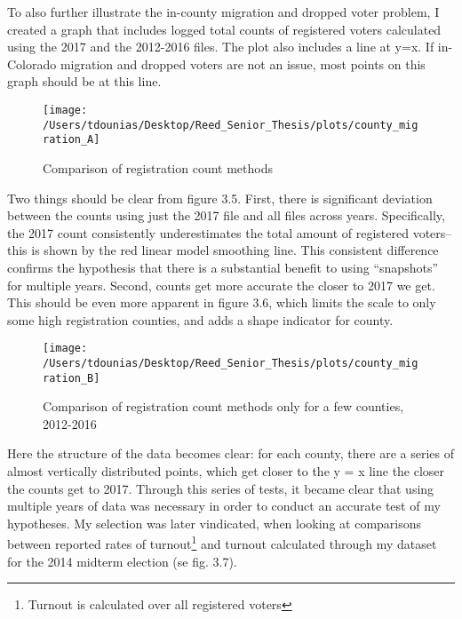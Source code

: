 \documentclass[12pt,twoside]{reedthesis}
\begin{document}
  To also further illustrate the in-county migration and dropped voter
  problem, I created a graph that includes logged total counts of
  registered voters calculated using the 2017 and the 2012-2016 files. The
  plot also includes a line at y=x. If in-Colorado migration and dropped
  voters are not an issue, most points on this graph should be at this
  line.
  
  \begin{figure}
  
  {\centering \texttt{[image: /Users/tdounias/Desktop/Reed\_Senior\_Thesis/plots/county\_migration\_A]} 
  
  }
  
  \caption[Comparison of registration count methods]{Comparison of registration count methods}\label{fig:county migration A}
  \end{figure}
  
  Two things should be clear from figure 3.5. First, there is significant
  deviation between the counts using just the 2017 file and all files
  across years. Specifically, the 2017 count consistently underestimates
  the total amount of registered voters--this is shown by the red linear
  model smoothing line. This consistent difference confirms the hypothesis
  that there is a substantial benefit to using ``snapshots'' for multiple
  years. Second, counts get more accurate the closer to 2017 we get. This
  should be even more apparent in figure 3.6, which limits the scale to
  only some high registration counties, and adds a shape indicator for
  county.
  
  \begin{figure}
  
  {\centering \texttt{[image: /Users/tdounias/Desktop/Reed\_Senior\_Thesis/plots/county\_migration\_B]} 
  
  }
  
  \caption[Comparison of registration count methods only for a few counties, 2012-2016]{Comparison of registration count methods only for a few counties, 2012-2016}\label{fig:county migration B}
  \end{figure}
  
  Here the structure of the data becomes clear: for each county, there are
  a series of almost vertically distributed points, which get closer to
  the y = x line the closer the counts get to 2017. Through this series of
  tests, it became clear that using multiple years of data was necessary
  in order to conduct an accurate test of my hypotheses. My selection was
  later vindicated, when looking at comparisons between reported rates of
  turnout\footnote{Turnout is calculated over all registered voters} and
  turnout calculated through my dataset for the 2014 midterm election (se
  fig. 3.7).
  
\end{document}
